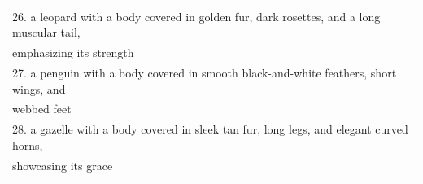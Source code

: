 \begin{table}[!ht]
\begin{threeparttable}
{\begin{tabular}{l}
26. a leopard with a body covered in golden fur, dark rosettes, and a long muscular tail, \\ \quad emphasizing its strength \\
27. a penguin with a body covered in smooth black-and-white feathers, short wings, and \\ \quad webbed feet \\
28. a gazelle with a body covered in sleek tan fur, long legs, and elegant curved horns, \\showcasing its grace \\

\bottomrule

\end{tabular}
}

\end{threeparttable}
\end{table}
